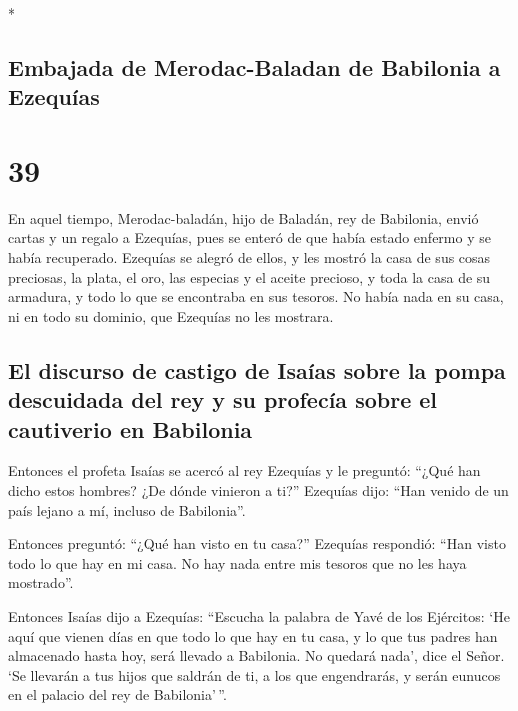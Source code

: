 \begin{paracol}{2}
\switchcolumn[0]*

\hypertarget{embajada-de-merodac-baladan-de-babilonia-a-ezequuxedas}{%
\subsection{Embajada de Merodac-Baladan de Babilonia a
Ezequías}\label{embajada-de-merodac-baladan-de-babilonia-a-ezequuxedas}}

\hypertarget{section-76}{%
\section{39}\label{section-76}}

 En aquel tiempo, Merodac-baladán, hijo de Baladán, rey de
Babilonia, envió cartas y un regalo a Ezequías, pues se enteró de que
había estado enfermo y se había recuperado.  Ezequías se
alegró de ellos, y les mostró la casa de sus cosas preciosas, la plata,
el oro, las especias y el aceite precioso, y toda la casa de su
armadura, y todo lo que se encontraba en sus tesoros. No había nada en
su casa, ni en todo su dominio, que Ezequías no les mostrara.

\hypertarget{el-discurso-de-castigo-de-isauxedas-sobre-la-pompa-descuidada-del-rey-y-su-profecuxeda-sobre-el-cautiverio-en-babilonia}{%
\subsection{El discurso de castigo de Isaías sobre la pompa descuidada
del rey y su profecía sobre el cautiverio en
Babilonia}\label{el-discurso-de-castigo-de-isauxedas-sobre-la-pompa-descuidada-del-rey-y-su-profecuxeda-sobre-el-cautiverio-en-babilonia}}

 Entonces el profeta Isaías se acercó al rey Ezequías y le
preguntó: ``¿Qué han dicho estos hombres? ¿De dónde vinieron a ti?''
Ezequías dijo: ``Han venido de un país lejano a mí, incluso de
Babilonia''.

 Entonces preguntó: ``¿Qué han visto en tu casa?''
Ezequías respondió: ``Han visto todo lo que hay en mi casa. No hay nada
entre mis tesoros que no les haya mostrado''.

 Entonces Isaías dijo a Ezequías: ``Escucha la palabra de
Yavé de los Ejércitos:  `He aquí que vienen días en que
todo lo que hay en tu casa, y lo que tus padres han almacenado hasta
hoy, será llevado a Babilonia. No quedará nada', dice el Señor.
 `Se llevarán a tus hijos que saldrán de ti, a los que
engendrarás, y serán eunucos en el palacio del rey de Babilonia'\,''.


\end{paracol}
